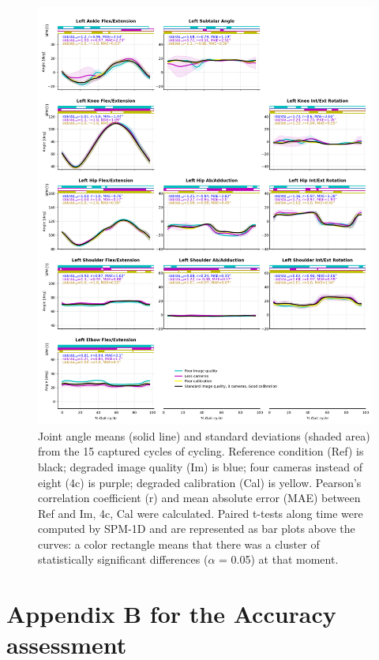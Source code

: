 \begin{figure}[!ht]
	\centering
	\def\svgwidth{1\columnwidth}
	\fontsize{10pt}{10pt}\selectfont
	\includegraphics[height=\dimexpr\textheight-145pt]{"../Annexes/Figures/Fig_BikeRobust.png"}
	\caption{Joint angle means (solid line) and standard deviations (shaded area) from the 15 captured cycles of cycling. Reference condition (Ref) is black; degraded image quality (Im) is blue; four cameras instead of eight (4c) is purple; degraded calibration (Cal) is yellow. Pearson’s correlation coefficient (r) and mean absolute error (MAE) between Ref and Im, 4c, Cal were calculated. Paired t-tests along time were computed by SPM-1D and are represented as bar plots above the curves: a color rectangle means that there was a cluster of statistically significant differences (\(\alpha\) = 0.05) at that moment.}
	\label{fig_bikerobust}
\end{figure}


\FloatBarrier
\chapter{Appendix B  for the Accuracy assessment}
\label{Ann:2}

